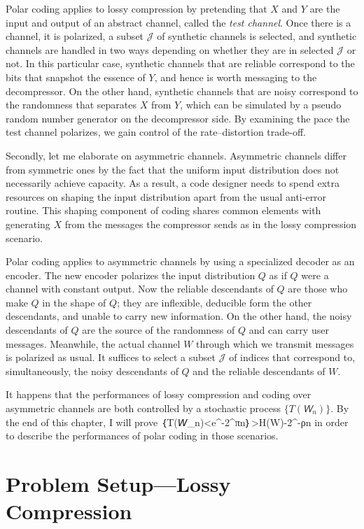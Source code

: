 \documentclass[openany]{amsbook}
\numberwithin{equation}{chapter}
\numberwithin{figure}{chapter}
\numberwithin{table}{chapter}
\def\[#1\]{\begin{equation*}{#1}\end{equation*}}
\theoremstyle{definition}	理dfn:Definition~?s			理exa:Example~?s
\theoremstyle{remark}		理cla:Claim~?s				理rem:Remark~?s
\begin{document}
	Polar coding applies to lossy compression by pretending that $X$ and $Y$
	are the input and output of an abstract channel, called the \emph{test channel}.
	Once there is a channel, it is polarized, a subset $𝒥$ of
	synthetic channels is selected, and synthetic channels are
	handled in two ways depending on whether they are in selected $𝒥$ or not.
	In this particular case, synthetic channels that are reliable correspond to the bits 
	that snapshot the essence of $Y$, and hence is worth messaging to the decompressor.
	On the other hand, synthetic channels that are noisy correspond to
	the randomness that separates $X$ from $Y$, which can be simulated
	by a pseudo random number generator on the decompressor side.
	By examining the pace the test channel polarizes,
	we gain control of the rate--distortion trade-off.
	
	Secondly, let me elaborate on asymmetric channels.
	Asymmetric channels differ from symmetric ones by the fact that
	the uniform input distribution does not necessarily achieve capacity.
	As a result, a code designer needs to spend extra resources on
	shaping the input distribution apart from the usual anti-error routine.
	This shaping component of coding shares common elements with generating $X$
	from the messages the compressor sends as in the lossy compression scenario.
	
	Polar coding applies to asymmetric channels
	by using a specialized decoder as an encoder.
	The new encoder polarizes the input distribution $Q$
	as if $Q$ were a channel with constant output.
	Now the reliable descendants of $Q$ are those who make $Q$ in the shape of $Q$;
	they are inflexible, deducible form the other descendants,
	and unable to carry new information.
	On the other hand, the noisy descendants of $Q$ are the source
	of the randomness of $Q$ and can carry user messages.
	Meanwhile, the actual channel $W$ through which
	we transmit messages is polarized as usual.
	It suffices to select a subset $𝒥$ of indices that correspond to, simultaneously,
	the noisy descendants of $Q$ and the reliable descendants of $W$.
	
	It happens that the performances of lossy compression and coding over
	asymmetric channels are both controlled by a stochastic process $\{T(𝘞_n)\}$.
	By the end of this chapter, I will prove
	\[𝘗｛T(𝘞_n)<e^{-2^{πn}}｝>H(W)-2^{-ρn}\]
	in order to describe the performances of polar coding in those scenarios.

\section{Problem Setup---Lossy Compression}
\end{document}
